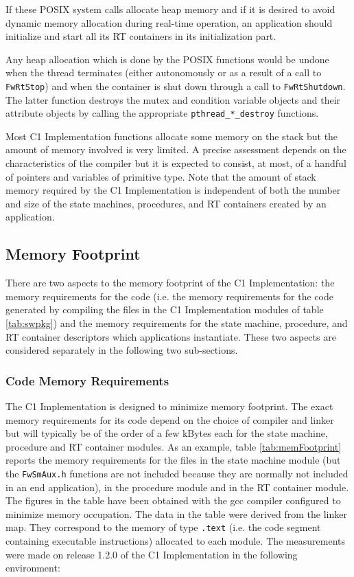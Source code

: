 \documentclass[manual]{../fwprofile}
\begin{document}
If these POSIX system calls allocate heap memory and if it is desired to avoid dynamic memory allocation during real-time operation, an application should initialize and start all its RT containers in its initialization part.

Any heap allocation which is done by the POSIX functions would be undone when the thread terminates (either autonomously or as a result of a call to \texttt{FwRtStop}) and when the container is shut down through a call to \texttt{FwRtShutdown}. The latter function destroys the mutex and condition variable objects and their attribute objects by calling the appropriate \texttt{pthread\_*\_destroy} functions.

Most C1 Implementation functions allocate some memory on the stack but the amount of memory involved is very limited. A precise assessment depends on the characteristics of the compiler but it is expected to consist, at most, of a handful of pointers and variables of primitive type. Note that the amount of stack memory required by the C1 Implementation is independent of both the number and size of the state machines, procedures, and RT containers created by an application.

\subsection{Memory Footprint}\label{sec:memFootprint}
There are two aspects to the memory footprint of the C1 Implementation: the memory requirements for the code (i.e. the memory requirements for the code generated by compiling the files in the C1 Implementation modules of table \ref{tab:swpkg}) and the memory requirements for the state machine, procedure, and RT container descriptors which applications instantiate. These two aspects are considered separately in the following two sub-sections.

\subsubsection{Code Memory Requirements}\label{sec:codeMemReq}
The C1 Implementation is designed to minimize memory footprint. The exact memory requirements for its code 
depend on the choice of compiler and linker but will typically be of the order of a few kBytes each for the 
state machine, procedure and RT container modules. As an example, table \ref{tab:memFootprint} reports the memory requirements 
for the files in the state machine module (but the \texttt{FwSmAux.h} functions are not included because  
they are normally not included in an end application), in the procedure module and in the RT container module. 
The figures in the table have been obtained with the gcc compiler configured to minimize memory occupation. 
The data in the table were derived from the linker map. 
They correspond to the memory of type \texttt{.text} (i.e. the code segment containing executable instructions) 
allocated to each module. The measurements were made on release 1.2.0 of the C1 Implementation in the following environment:
\end{document}

